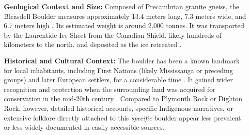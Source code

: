 \documentclass[
11pt, %
english, %
singlespacing, %
headsepline, %
]{MastersDoctoralThesis} %
\begin{document}
\textbf{Geological Context and Size:} Composed of Precambrian granite gneiss, the Bleasdell Boulder measures approximately 13.4 meters long, 7.3 meters wide, and 6.7 meters high \cite{LTCBleasdell}. Its estimated weight is around 2,000 tonnes. It was transported by the Laurentide Ice Sheet from the Canadian Shield, likely hundreds of kilometers to the north, and deposited as the ice retreated \cite{Chapman1984}.

\textbf{Historical and Cultural Context:} The boulder has been a known landmark for local inhabitants, including First Nations (likely Mississauga or preceding groups) and later European settlers, for a considerable time \cite{Chapman1984}. It gained wider recognition and protection when the surrounding land was acquired for conservation in the mid-20th century \cite{LTCBleasdell}. Compared to Plymouth Rock or Dighton Rock, however, detailed historical accounts, specific Indigenous narratives, or extensive folklore directly attached to this \emph{specific} boulder appear less prevalent or less widely documented in easily accessible sources.
\end{document}
